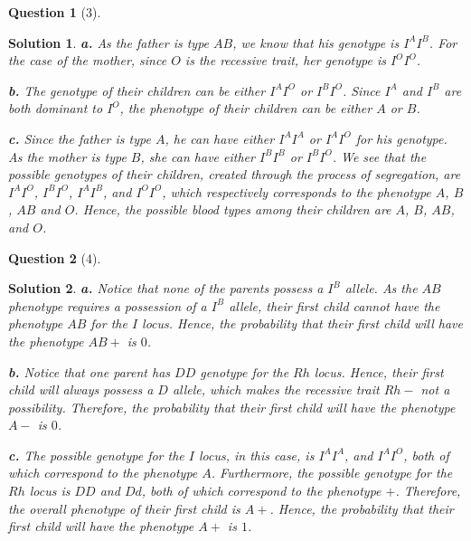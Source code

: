 \documentclass{article} %
\theoremstyle{quest}
\newtheorem*{question}{Question}
\newtheorem*{solution}{Solution}
\begin{document}
\pagebreak

\begin{question}[3]
\end{question}
\begin{solution}
\textbf{a.} As the father is type $AB$, we know that his genotype is $I^A I^B$. For the case of the mother,
since $O$ is the recessive trait, her genotype is $I^O I^O$. \\

\smallskip

\textbf{b.} The genotype of their children can be either $I^A I^O$ or $I^B I^O$. Since 
$I^A$ and $I^B$ are both dominant to $I^O$, the phenotype of their children can be
either $A$ or $B$. \\

\smallskip

\textbf{c.} Since the father is type $A$, he can have either $I^A I^A$ or $I^A I^O$ 
for his genotype. As the mother is type $B$, she can have either $I^B I^B$ or $I^B I^O$.
We see that the possible genotypes of their children, created through the process of 
segregation, are $I^A I^O$, $I^B I^O$, $I^A I^B$, and $I^O I^O$, which respectively corresponds
to the phenotype $A$, $B$, $AB$ and $O$.
Hence, the possible blood types among their children are $A$, $B$, $AB$, and $O$.


\end{solution}

\bigskip

\begin{question}[4]
\end{question}
\begin{solution}
\textbf{a.} 
Notice that none of the parents possess a $I^B$ allele. As the $AB$ phenotype requires 
a possession of a $I^B$ allele, their first child cannot have the phenotype $AB$ for the
$I$ locus. Hence, the probability that their first child will have the phenotype $AB+$ is
$0$. \\

\smallskip

\textbf{b.} Notice that one parent has $DD$ genotype for the $Rh$ locus. Hence, their first
child will always possess a $D$ allele, which makes the recessive trait $Rh-$ not a
possibility. Therefore, the probability that their first child will have the phenotype $A-$
is $0$. \\

\smallskip

\textbf{c.} The possible genotype for the $I$ locus, in this case, is
$I^A I^A$, and $I^A I^O$, both of which correspond to the phenotype $A$.
Furthermore, the possible genotype for the $Rh$ locus is $DD$ and $Dd$, both of which correspond 
to the phenotype $+$. Therefore, the overall phenotype of their first child is $A+$.
Hence, the probability that their first child will have the phenotype $A+$ is $1$. \\


\end{solution}
\end{document}
